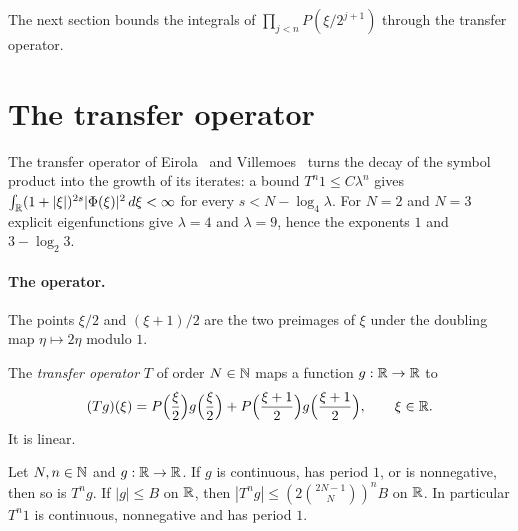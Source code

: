 The next section bounds the integrals of $\prod_{j<n} P(\xi/2^{j+1})$ through the transfer
operator.

\section{The transfer operator}

The transfer operator of Eirola~\cite{Eirola} and Villemoes~\cite{Villemoes} turns the decay of
the symbol product into the growth of its iterates: a bound $T^n 1 \leq C \lambda^n$ gives
$\int_{\mathbb{R}} (1 + |\xi|)^{2s} |\Phi(\xi)|^2 \, d\xi < \infty$ for every $s < N - \log_4 \lambda$. For
$N = 2$ and $N = 3$ explicit eigenfunctions give $\lambda = 4$ and $\lambda = 9$, hence the
exponents $1$ and $3 - \log_2 3$.

\paragraph{The operator.}
The points $\xi/2$ and $(\xi + 1)/2$ are the two preimages of $\xi$ under the doubling map
$\eta \mapsto 2\eta$ modulo $1$.

\begin{definition}
\label{def:daub-transfer}
\leanok
{}
The \emph{transfer operator} $T$ of order $N \in \mathbb{N}$ maps a function $g : \mathbb{R} \to \mathbb{R}$ to
\[
  (T g)(\xi) = P\Bigl(\frac{\xi}{2}\Bigr) g\Bigl(\frac{\xi}{2}\Bigr)
    + P\Bigl(\frac{\xi + 1}{2}\Bigr) g\Bigl(\frac{\xi + 1}{2}\Bigr) , \qquad \xi \in \mathbb{R} .
\]
It is linear.
\end{definition}

\begin{lemma}
\label{lem:daub-transfer-iterates}
\leanok
{}
Let $N, n \in \mathbb{N}$ and $g : \mathbb{R} \to \mathbb{R}$. If $g$ is continuous, has period $1$, or is nonnegative,
then so is $T^n g$. If $|g| \leq B$ on $\mathbb{R}$, then $|T^n g| \leq (2 \binom{2N-1}{N})^n B$ on $\mathbb{R}$.
In particular $T^n 1$ is continuous, nonnegative and has period $1$.
\end{lemma}


